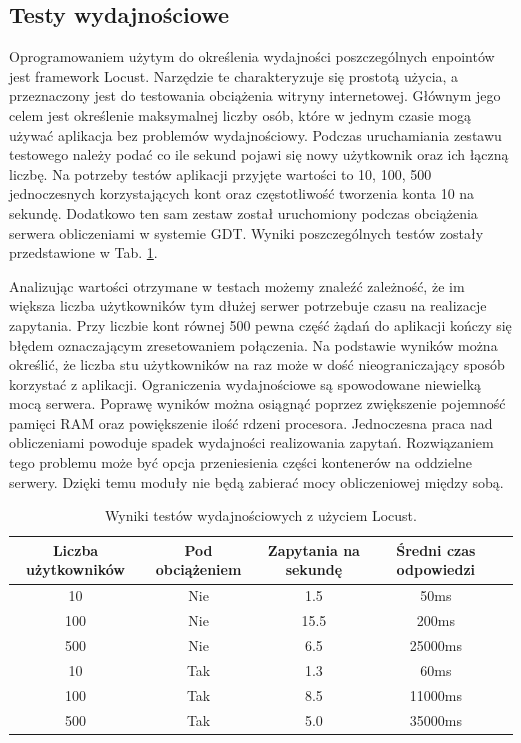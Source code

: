 \subsection{Testy wydajnościowe}
Oprogramowaniem użytym do określenia wydajności poszczególnych enpointów jest framework Locust. Narzędzie te charakteryzuje się prostotą użycia, a przeznaczony jest do testowania obciążenia witryny internetowej. Głównym jego celem jest określenie maksymalnej liczby osób, które w jednym czasie mogą używać aplikacja bez problemów wydajnościowy. Podczas uruchamiania zestawu testowego należy podać co ile sekund pojawi się nowy użytkownik oraz ich łączną liczbę. Na potrzeby testów aplikacji przyjęte wartości to 10, 100, 500 jednoczesnych korzystających kont oraz częstotliwość tworzenia konta 10 na sekundę. Dodatkowo ten sam zestaw został uruchomiony podczas obciążenia serwera obliczeniami w systemie GDT. Wyniki poszczególnych testów zostały przedstawione w Tab. \ref{tabela_4_test_locust}. 

Analizując wartości otrzymane w testach możemy znaleźć zależność, że im większa liczba użytkowników tym dłużej serwer potrzebuje czasu na realizacje zapytania. Przy liczbie kont równej 500 pewna część żądań do aplikacji kończy się błędem oznaczającym zresetowaniem połączenia. Na podstawie wyników można określić, że liczba stu użytkowników na raz może w dość nieograniczający sposób korzystać z aplikacji. Ograniczenia wydajnościowe są spowodowane niewielką mocą serwera. Poprawę wyników można osiągnąć poprzez zwiększenie pojemność pamięci RAM oraz powiększenie ilość rdzeni procesora. Jednoczesna praca nad obliczeniami powoduje spadek wydajności realizowania zapytań. Rozwiązaniem tego problemu może być opcja przeniesienia części kontenerów na oddzielne serwery. Dzięki temu moduły nie będą zabierać mocy obliczeniowej między sobą.  

\begin{table}[htb]
	\caption{Wyniki testów wydajnościowych z użyciem Locust.}
	\centering
	\begin{tabular}{|c|c|c|c|p{9cm}|}
		\hline
		\textbf{Liczba użytkowników}  & \textbf{Pod obciążeniem}  & \textbf{Zapytania na sekundę} & \textbf{Średni czas odpowiedzi} \\\hline
		10 & Nie & 1.5 & 50ms \\\hline
		100 & Nie & 15.5 & 200ms \\\hline
		500 & Nie & 6.5 & 25000ms \\\hline
		10 & Tak & 1.3 & 60ms \\\hline
		100 & Tak & 8.5 & 11000ms \\\hline
		500 & Tak & 5.0 & 35000ms \\\hline
	
		
	\end{tabular}
	\label{tabela_4_test_locust}
\end{table}

